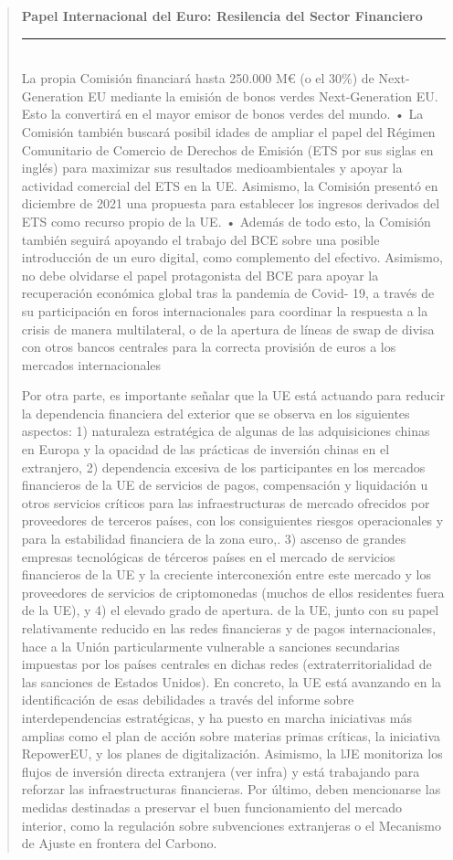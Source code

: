 \documentclass[10pt,a4paper]{article}
\newenvironment{specialblock}[1]{%
      \begin{quote} %
      \small %
      \noindent\textbf{#1}\\[-0.3em] %
      \rule{\linewidth}{0.4pt}\\[0.6em]}{
      \end{quote}}
\begin{document}
\begin{specialblock}{Papel Internacional del Euro: Resilencia del Sector Financiero}
{        La propia Comisión financiará hasta 250.000 M€ (o el 30\%) de Next-Generation EU mediante la emisión de bonos verdes Next-Generation EU. Esto la convertirá en el mayor emisor de bonos verdes del mundo.
    }
    • La Comisión también buscará posibil idades de ampliar el papel del Régimen Comunitario de Comercio de Derechos de Emisión (ETS por sus siglas en inglés) para maximizar sus resultados medioambientales y apoyar la actividad comercial del ETS en la UE. Asimismo, la Comisión presentó en diciembre de 2021 una propuesta para establecer los ingresos derivados del ETS como recurso propio de la UE.
    • Además de todo esto, la Comisión también seguirá apoyando el trabajo del BCE sobre una posible introducción de un euro digital, como complemento del efectivo. Asimismo, no debe olvidarse el papel protagonista del BCE para apoyar la recuperación económica global tras la pandemia de Covid- 19, a través de su participación en foros internacionales para coordinar la respuesta a la crisis de manera multilateral, o de la apertura de líneas de swap de divisa con otros bancos centrales para la correcta provisión de euros a los mercados internacionales

    Por otra parte, es importante señalar que la UE está actuando para reducir la dependencia financiera del exterior que se observa en los siguientes aspectos: 1) naturaleza estratégica de algunas de las adquisiciones chinas en Europa y la opacidad de las prácticas de inversión chinas en el extranjero, 2) dependencia excesiva de los participantes en los mercados financieros de la UE de servicios de pagos, compensación y liquidación u otros servicios críticos para las infraestructuras de mercado ofrecidos por proveedores de terceros países, con los consiguientes riesgos operacionales y para la estabilidad financiera de la zona euro,. 3) ascenso de grandes empresas tecnológicas de térceros países en el mercado de servicios financieros de la UE y la creciente interconexión entre este mercado y los proveedores de servicios de criptomonedas (muchos de ellos residentes fuera de la UE), y 4) el elevado grado de apertura. de la UE, junto con su papel relativamente reducido en las redes financieras y de pagos internacionales, hace a la Unión particularmente vulnerable a sanciones secundarias impuestas por los países centrales en dichas redes (extraterritorialidad de las sanciones de Estados Unidos). En concreto, la UE está avanzando en la identificación de esas debilidades a través del informe sobre interdependencias estratégicas, y ha puesto en marcha iniciativas más amplias como el plan de acción sobre materias primas críticas, la iniciativa RepowerEU, y los planes de digitalización. Asimismo, la lJE monitoriza los flujos de inversión directa extranjera (ver infra) y está trabajando para reforzar las infraestructuras financieras. Por último, deben mencionarse las medidas destinadas a preservar el buen funcionamiento del mercado interior, como la regulación sobre subvenciones extranjeras o el Mecanismo de Ajuste en frontera del Carbono.
\end{specialblock}
\end{document}
